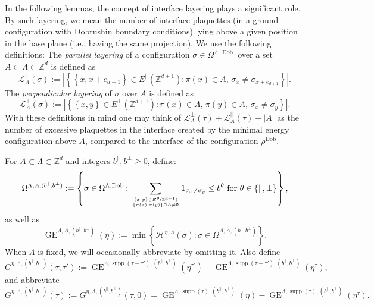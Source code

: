 \documentclass[11pt, reqno]{amsart}
\newcommand{\Z}{\mathbb{Z}}
\DeclareMathOperator{\supp}{supp}
\DeclareMathOperator{\Dob}{Dob}
\DeclareMathOperator{\GE}{GE}
\newcommand\mysubstack[2]{\genfrac{}{}{0pt}{}{#1}{#2}}
\numberwithin{equation}{section}
\begin{document}
\smallskip

In the following lemmas, the concept of interface layering plays a significant role. 
By such layering, we mean the number of interface plaquettes (in a ground configuration with Dobrushin boundary conditions) lying above a given position in the base plane (i.e., having the same projection). 
We use the following definitions:
The \emph{parallel layering} of a configuration $\sigma\in \Omega^{\Lambda,\Dob}$ over a set $A\subset\Lambda\subset\Z^d$ is defined as
\begin{equation}\label{eq:parallel_layering}
{\mathcal L}^{\parallel}_{A}(\sigma):=\left\lvert \left\{ \left\{x,x+e_{d+1} \right\} \in E^{\parallel}(\Z^{d+1}) \colon \pi\left(x\right)\in A,\,
\sigma_x \neq \sigma_{x+e_{d
+1}}\right\} \right\rvert .
\end{equation}
The \emph{perpendicular layering} of  $\sigma$ over $A$ is defined as
\begin{equation}\label{eq:perpendicular_layering}
{\mathcal L}^{\perp}_{A}(\sigma):=\left\lvert \left\{ \left\{x,y\right\} \in E^{\perp}(\Z^{d+1}) \colon  \pi\left(x\right)\in A , \, \pi\left(y\right)\in A , \, 
\sigma_x \neq \sigma_{y}\right\}\right\rvert .
\end{equation}
With these definitions in mind one may think of ${\mathcal L}^{\perp}_{A}(\tau)+{\mathcal L}^{\parallel}_{A}(\tau)-|A|$ as the number of excessive plaquettes in the interface created by the minimal energy configuration above $A$, compared to the interface of the configuration $\rho^{\Dob}$.

For $A\subset \Lambda \subset\Z^{d}$ and integers
$b^{\parallel},b^{\perp}\ge 0$, define:
\begin{equation*}
\Omega^{\Lambda,A,(b^{\parallel},b^{\perp})}:=\left\{ \sigma \in \Omega^{\Lambda,\Dob}\colon\sum\limits_{\mysubstack{\{x,y\}\in E^{\theta}(\Z^{d+1})}{ \{\pi(x),\pi(y)\} \cap A\neq \emptyset}} \mathrm{1}_{\sigma_x\neq \sigma_y}\leq b^{\theta}\text{ for }\theta\in \{\parallel, \perp \}\right\},    
\end{equation*}
as well as
\begin{equation}\label{eq:restricted ground energy}
\GE ^{\Lambda,A,(b^{\parallel},b^{\perp})}(\eta):=
\min\left\{\mathcal{H}^{\eta,\Lambda}(\sigma) \colon\sigma \in \Omega^{\Lambda,A,(b^{\parallel},b^{\perp})}\right\}.
\end{equation}
When $\Lambda$ is fixed, we will occasionally abbreviate by omitting it.
Also define
\begin{equation*}
G^{\eta, \Lambda,(b^{\parallel},b^{\perp})}(\tau, \tau'):=\GE^{\Lambda,\supp(\tau-\tau'),(b^{\parallel},b^{\perp})}(\eta^{\tau'}) - \GE^{\Lambda, \supp(\tau-\tau'),(b^{\parallel},b^{\perp})}(\eta^{\tau}),
\end{equation*}
and abbreviate
\begin{equation*}
G^{\eta, \Lambda,(b^{\parallel},b^{\perp})}(\tau) := G^{\eta, \Lambda,(b^{\parallel},b^{\perp})}(\tau,0)= \GE^{\Lambda,\supp(\tau),(b^{\parallel},b^{\perp})}(\eta) - \GE^{\Lambda,\supp(\tau),(b^{\parallel},b^{\perp})}(\eta^{\tau}).
\end{equation*}
\end{document}
